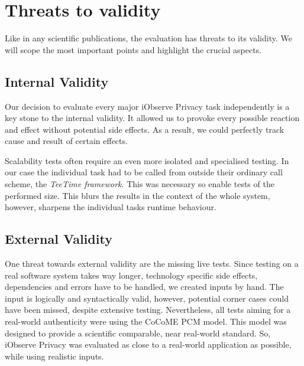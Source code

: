 \section{Threats to validity}
\label{sec:eval:threats}

Like in any scientific publications, the evaluation has threats to its validity. We will scope the most important points and highlight the crucial aspects.   

\subsection{Internal Validity} %

Our decision to evaluate every major iObserve Privacy task independently is a key stone to the internal validity. It allowed us to provoke every possible reaction and effect without potential side effects. As a result, we could perfectly track cause and result of certain effects.

Scalability tests often require an even more isolated and specialised testing. In our case the individual task had to be called from outside their ordinary call scheme, the \textit{TeeTime framework}. This was necessary so enable tests of the performed size. This blurs the results in the context of the whole system, however, sharpens the individual tasks runtime behaviour.  

\subsection{External Validity} %

One threat towards external validity are the missing live tests. Since testing on a real software system takes way longer, technology specific side effects, dependencies and errors have to be handled, we created inputs by hand. The input is logically and syntactically valid, however, potential corner cases could have been missed, despite extensive testing.  Nevertheless, all tests aiming for a real-world authenticity were using the CoCoME PCM model. This model was designed to provide a scientific comparable, near real-world standard. So, iObserve Privacy was evaluated as close to a real-world application as possible, while using realistic inputs.

